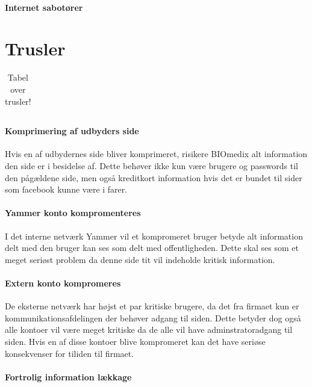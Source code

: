 \documentclass{article}
\begin{document}
\paragraph{Internet sabotører}

\section{Trusler}

\begin{table}
    \begin{tabular}{l|l|l}
         
    \end{tabular}
    \label{tab:Trusler}
    \caption{Tabel over trusler!}
\end{table}

\paragraph{Komprimering af udbyders side}
Hvis en af udbydernes side bliver komprimeret, risikere BIOmedix alt information
den side er i besidelse af. Dette behøver ikke kun være brugere og passwords til
den pågældene side, men også kreditkort information hvis det er bundet til
sider som facebook kunne være i farer.

\paragraph{Yammer konto kompromenteres}
I det interne netværk Yammer vil et kompromeret bruger betyde alt information
delt med den bruger kan ses som delt med offentligheden. Dette skal ses som et
meget seriøst problem da denne side tit vil indeholde kritisk information.

\paragraph{Extern konto kompromeres}
De eksterne netværk har højst et par kritiske brugere, da det fra firmaet kun er 
kommunikationsafdelingen der behøver adgang til siden. Dette betyder dog også
alle kontoer vil være meget kritiske da de alle vil have adminstratoradgang til
siden. Hvis en af disse kontoer blive kompromeret kan det have seriøse konsekvenser
for tiliden til firmaet.

\paragraph{Fortrolig information lækkage}
\end{document}
